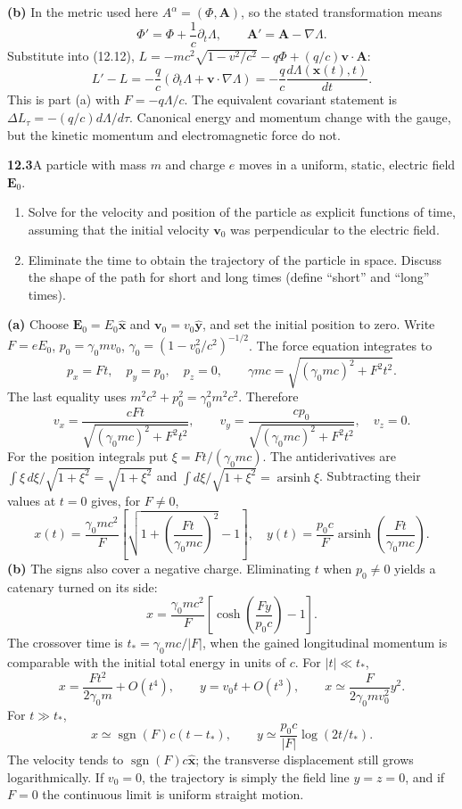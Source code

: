 \medskip\noindent\textbf{(b)} In the metric used here $A^\alpha=(\Phi,\mathbf A)$, so the
stated transformation means
\[
\Phi' =\Phi+\frac1c\partial_t\Lambda,\qquad
\mathbf A'=\mathbf A-\nabla\Lambda.
\]
Substitute into (12.12),
$L=-mc^2\sqrt{1-v^2/c^2}-q\Phi+(q/c)\mathbf v\cdot\mathbf A$:
\[
L'-L=-\frac qc\left(\partial_t\Lambda+
 \mathbf v\cdot\nabla\Lambda\right)
=\boxed{-\frac qc\frac{d\Lambda(\mathbf x(t),t)}{dt}.}
\]
This is part (a) with $F=-q\Lambda/c$.  The equivalent covariant
statement is $\Delta L_\tau=-(q/c)d\Lambda/d\tau$.
Canonical energy and momentum change with the gauge, but the kinetic
momentum and electromagnetic force do not.

\par\bigskip
\noindent\textbf{12.3}\quad A particle with mass $m$ and charge $e$ moves in a uniform, static, electric field $\mathbf{E}_{0}$.
\begin{enumerate}
\item[(a)] Solve for the velocity and position of the particle as explicit functions of time, assuming that the initial velocity $\mathbf{v}_{0}$ was perpendicular to the electric field.
\item[(b)] Eliminate the time to obtain the trajectory of the particle in space. Discuss the shape of the path for short and long times (define ``short'' and ``long'' times).
\end{enumerate}
\solution

\medskip\noindent\textbf{(a)} Choose $\mathbf E_0=E_0\widehat{\mathbf x}$ and
$\mathbf v_0=v_0\widehat{\mathbf y}$, and set the initial position
to zero.  Write $F=eE_0$, $p_0=\gamma_0mv_0$,
$\gamma_0=(1-v_0^2/c^2)^{-1/2}$.  The force equation integrates to
\[
p_x=Ft,\quad p_y=p_0,\quad p_z=0,\qquad
\gamma mc=\sqrt{(\gamma_0mc)^2+F^2t^2}.
\]
The last equality uses $m^2c^2+p_0^2=\gamma_0^2m^2c^2$.
Therefore
\[
\boxed{v_x=\frac{cFt}{\sqrt{(\gamma_0mc)^2+F^2t^2}},\qquad
v_y=\frac{cp_0}{\sqrt{(\gamma_0mc)^2+F^2t^2}},\quad v_z=0.}
\]
For the position integrals put $\xi=Ft/(\gamma_0mc)$.
The antiderivatives are
$\int \xi\,d\xi/\sqrt{1+\xi^2}=\sqrt{1+\xi^2}$
and $\int d\xi/\sqrt{1+\xi^2}=\operatorname{arsinh}\xi$.
Subtracting their values at $t=0$ gives, for $F\ne0$,
\[
\boxed{x(t)=\frac{\gamma_0mc^2}{F}
 \left[\sqrt{1+\left(\frac{Ft}{\gamma_0mc}\right)^2}-1\right],
\quad
 y(t)=\frac{p_0c}{F}\operatorname{arsinh}
 \left(\frac{Ft}{\gamma_0mc}\right).}
\]
\medskip\noindent\textbf{(b)} The signs also cover a negative charge.  Eliminating $t$ when
$p_0\ne0$ yields a catenary turned on its side:
\[
\boxed{x=\frac{\gamma_0mc^2}{F}
 \left[\cosh\left(\frac{Fy}{p_0c}\right)-1\right].}
\]
The crossover time is $t_* =\gamma_0mc/|F|$, when the gained
longitudinal momentum is comparable with the initial total energy
in units of $c$.  For $|t|\ll t_*$,
\[
x=\frac{Ft^2}{2\gamma_0m}+O(t^4),\qquad
 y=v_0t+O(t^3),\qquad
x\simeq\frac{F}{2\gamma_0mv_0^2}y^2.
\]
For $t\gg t_*$,
\[
x\simeq\operatorname{sgn}(F)c(t-t_*),\qquad
 y\simeq\frac{p_0c}{|F|}\log(2t/t_*).
\]
The velocity tends to $\operatorname{sgn}(F)c\widehat{\mathbf x}$;
the transverse displacement still grows logarithmically.
If $v_0=0$, the trajectory is simply the field line $y=z=0$,
and if $F=0$ the continuous limit is uniform straight motion.

